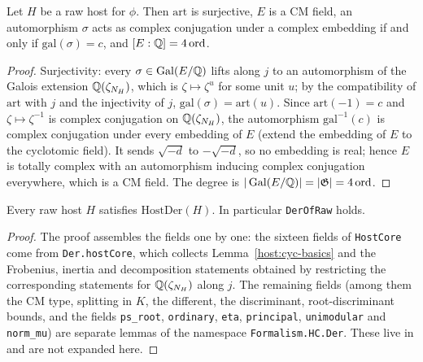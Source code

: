 \begin{lemma}\label{host:cyc-basics}
Let $H$ be a raw host for $\phi$. Then $\mathrm{art}$ is surjective, $E$ is
a CM field, an automorphism $\sigma$ acts as complex conjugation under a
complex embedding if and only if $\mathrm{gal}(\sigma)=c$, and
$[E:\mathbb{Q}]=4\,\mathrm{ord}$.
\end{lemma}
\begin{proof}
Surjectivity: every $\sigma\in\operatorname{Gal}(E/\mathbb{Q})$ lifts along $j$ to an
automorphism of the Galois extension $\mathbb{Q}(\zeta_{N_H})$, which is
$\zeta\mapsto\zeta^u$ for some unit $u$; by the compatibility of
$\mathrm{art}$ with $j$ and the injectivity of $j$,
$\mathrm{gal}(\sigma)=\mathrm{art}(u)$. Since $\mathrm{art}(-1)=c$ and
$\zeta\mapsto\zeta^{-1}$ is complex conjugation on $\mathbb{Q}(\zeta_{N_H})$, the
automorphism $\mathrm{gal}^{-1}(c)$ is complex conjugation under every
embedding of $E$ (extend the embedding of $E$ to the cyclotomic field).
It sends $\sqrt{-d}$ to $-\sqrt{-d}$, so no embedding is real; hence $E$
is totally complex with an automorphism inducing complex conjugation
everywhere, which is a CM field. The degree is
$|\operatorname{Gal}(E/\mathbb{Q})|=|\mathfrak G|=4\,\mathrm{ord}$.
\end{proof}

\begin{lemma}\label{host:raw-der}
Every raw host $H$ satisfies $\mathrm{HostDer}(H)$. In particular
\texttt{DerOfRaw} holds.
\end{lemma}
\begin{proof}
The proof assembles the fields one by one: the sixteen fields of
\texttt{HostCore} come from \texttt{Der.hostCore}, which collects
Lemma~\ref{host:cyc-basics} and the Frobenius, inertia and decomposition
statements obtained by restricting the corresponding statements for
$\mathbb{Q}(\zeta_{N_H})$ along $j$. The remaining fields (among them the CM type, splitting in
$K$, the different, the discriminant, root-discriminant bounds, and the fields \texttt{ps\_root}, \texttt{ordinary}, \texttt{eta}, \texttt{principal}, \texttt{unimodular} and \texttt{norm\_mu}) are separate
lemmas of the namespace \texttt{Formalism.HC.Der}. These live in
and are not expanded here.
\end{proof}

